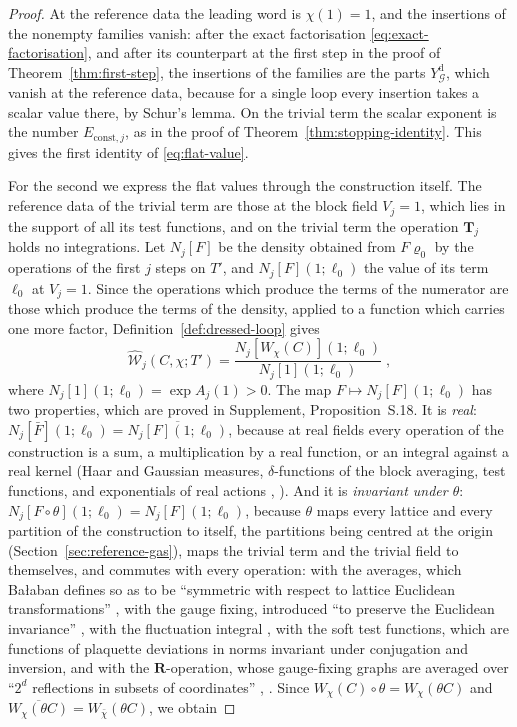 \documentclass[11pt]{preprint}
\numberwithin{equation}{section}
\theoremstyle{definition}
\theoremstyle{remark}
\theoremstyle{plain}
\begin{document}
\begin{proof}
At the reference data the leading word is $\chi(1) = 1$, and the insertions of the nonempty families vanish: after the exact factorisation \eqref{eq:exact-factorisation}, and after its counterpart at the first step in the proof of Theorem~\ref{thm:first-step}, the insertions of the families are the parts $Y^{\mathrm d}_{\mathcal G}$, which vanish at the reference data, because for a single loop every insertion takes a scalar value there, by Schur's lemma. On the trivial term the scalar exponent is the number $E_{\mathrm{const},j}$, as in the proof of Theorem~\ref{thm:stopping-identity}. This gives the first identity of \eqref{eq:flat-value}.

For the second we express the flat values through the construction itself. The reference data of the trivial term are those at the block field $V_j = 1$, which lies in the support of all its test functions, and on the trivial term the operation $\mathbf T_j$ holds no integrations. Let $N_j[F]$ be the density obtained from $F\varrho_0$ by the operations of the first $j$ steps on $T'$, and $N_j[F](1; \ell_0)$ the value of its term $\ell_0$ at $V_j = 1$. Since the operations which produce the terms of the numerator are those which produce the terms of the density, applied to a function which carries one more factor, Definition~\ref{def:dressed-loop} gives
\begin{equation}\label{eq:flat-value-ratio}
    \widehat{\mathcal W}_j(C, \chi; T') = \frac{N_j[W_\chi(C)](1; \ell_0)}{N_j[1](1; \ell_0)}\;,
\end{equation}
where $N_j[1](1; \ell_0) = \exp A_j(1) > 0$. The map $F \mapsto N_j[F](1; \ell_0)$ has two properties, which are proved in Supplement, Proposition~S.18. It is \emph{real}: $N_j[\bar F](1; \ell_0) = \overline{N_j[F](1; \ell_0)}$, because at real fields every operation of the construction is a sum, a multiplication by a real function, or an integral against a real kernel (Haar and Gaussian measures, $\delta$-functions of the block averaging, test functions, and exponentials of real actions \cite[(3.27), p.~271]{BalabanCRE}, \cite[p.~380]{BalabanLFR2}). And it is \emph{invariant under $\theta$}: $N_j[F \circ \theta](1; \ell_0) = N_j[F](1; \ell_0)$, because $\theta$ maps every lattice and every partition of the construction to itself, the partitions being centred at the origin (Section~\ref{sec:reference-gas}), maps the trivial term and the trivial field to themselves, and commutes with every operation: with the averages, which Ba{\l}aban defines so as to be ``symmetric with respect to lattice Euclidean transformations'' \cite[p.~252]{BalabanRG1}, with the gauge fixing, introduced ``to preserve the Euclidean invariance'' \cite[p.~247]{BalabanCRE}, with the fluctuation integral \cite[(2.17), (2.18), p.~269]{BalabanRG1}, with the soft test functions, which are functions of plaquette deviations in norms invariant under conjugation and inversion, and with the $\mathbf R$-operation, whose gauge-fixing graphs are averaged over ``$2^d$ reflections in subsets of coordinates'' \cite[(1.100), p.~201]{BalabanLFR1}, \cite[p.~379]{BalabanLFR2}. Since $W_\chi(C) \circ \theta = W_\chi(\theta C)$ and $\overline{W_\chi(\theta C)} = W_{\bar\chi}(\theta C)$, we obtain

\end{proof}
\end{document}

